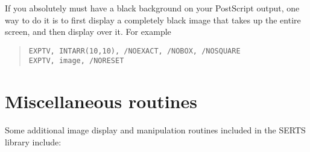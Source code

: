 If you absolutely must have a black background on your PostScript output, one
way to do it is to first display a completely black image that takes up the
entire screen, and then display over it.  For example
\begin{quote}
\begin{verbatim}
EXPTV, INTARR(10,10), /NOEXACT, /NOBOX, /NOSQUARE
EXPTV, image, /NORESET
\end{verbatim}
\end{quote}

\section{Miscellaneous routines}

Some additional image display and manipulation routines included in the SERTS
library include:
